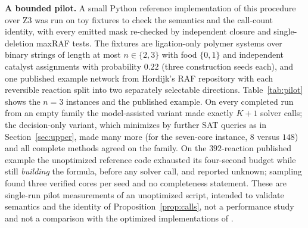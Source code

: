 \documentclass[11pt,a4paper]{article}
\theoremstyle{plain}
\theoremstyle{definition}
\theoremstyle{remark}
\begin{document}
\medskip
\noindent\textbf{A bounded pilot.} A small Python reference implementation of this procedure over Z3 \cite{demoura2008z3} was run on toy fixtures to check the semantics and the call-count identity, with every emitted mask re-checked by independent closure and single-deletion maxRAF tests. The fixtures are ligation-only polymer systems over binary strings of length at most $n\in\{2,3\}$ with food $\{0,1\}$ and independent catalyst assignments with probability $0.22$ (three construction seeds each), and one published example network from Hordijk's RAF repository with each reversible reaction split into two separately selectable directions. Table~\ref{tab:pilot} shows the $n=3$ instances and the published example. On every completed run from an empty family the model-assisted variant made exactly $K+1$ solver calls; the decision-only variant, which minimizes by further SAT queries as in Section~\ref{sec:upper}, made many more (for the seven-core instance, $8$ versus $148$) and all complete methods agreed on the family. On the $392$-reaction published example the unoptimized reference code exhausted its four-second budget while still \emph{building} the formula, before any solver call, and reported unknown; sampling found three verified cores per seed and no completeness statement. These are single-run pilot measurements of an unoptimized script, intended to validate semantics and the identity of Proposition~\ref{prop:calls}, not a performance study and not a comparison with the optimized implementations of \cite{hordijk2015algorithms,hordijk2026enumerating}.
\end{document}
